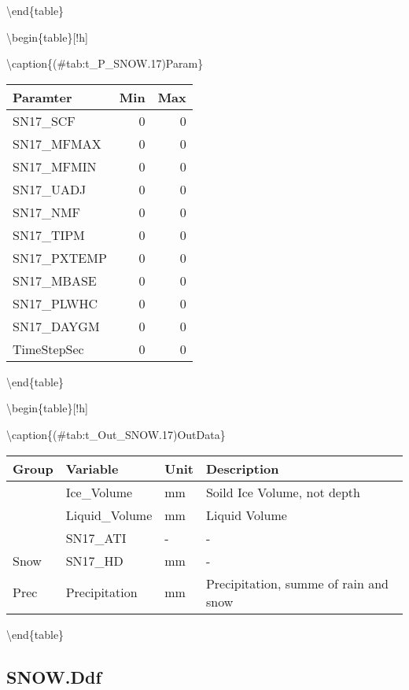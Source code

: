 \documentclass[
]{book}
\begin{document}
\textbackslash end\{table\}

\textbackslash begin\{table\}{[}!h{]}

\textbackslash caption\{(\#tab:t\_P\_SNOW.17)Param\}
\centering

\begin{tabular}[t]{l|r|r}
\hline
Paramter & Min & Max\\
\hline
SN17\_SCF & 0 & 0\\
\cline{1-3}
SN17\_MFMAX & 0 & 0\\
\cline{1-3}
SN17\_MFMIN & 0 & 0\\
\cline{1-3}
SN17\_UADJ & 0 & 0\\
\cline{1-3}
SN17\_NMF & 0 & 0\\
\cline{1-3}
SN17\_TIPM & 0 & 0\\
\cline{1-3}
SN17\_PXTEMP & 0 & 0\\
\cline{1-3}
SN17\_MBASE & 0 & 0\\
\cline{1-3}
SN17\_PLWHC & 0 & 0\\
\cline{1-3}
SN17\_DAYGM & 0 & 0\\
\cline{1-3}
TimeStepSec & 0 & 0\\
\hline
\end{tabular}

\textbackslash end\{table\}

\textbackslash begin\{table\}{[}!h{]}

\textbackslash caption\{(\#tab:t\_Out\_SNOW.17)OutData\}
\centering

\begin{tabular}[t]{l|l|l|l}
\hline
Group & Variable & Unit & Description\\
\hline
 & Ice\_Volume & mm & Soild Ice Volume, not depth\\
\cline{2-4}
 & Liquid\_Volume & mm & Liquid Volume\\
\cline{2-4}
 & SN17\_ATI & - & -\\
\cline{2-4}
\multirow{-4}{*}{\raggedright\arraybackslash Snow} & SN17\_HD & mm & -\\
\cline{1-4}
Prec & Precipitation & mm & Precipitation, summe of rain and snow\\
\hline
\end{tabular}

\textbackslash end\{table\}

\hypertarget{snow.ddf}{%
\subsection{SNOW.Ddf}\label{snow.ddf}}
\end{document}
